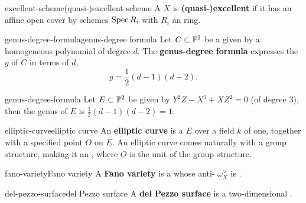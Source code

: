 \begin{topic}{excellent-scheme}{(quasi-)excellent scheme}
    A  $X$ is \textbf{(quasi-)excellent} if it has an affine open cover by schemes $\operatorname{Spec} R_i$ with $R_i$ an  ring.
\end{topic}

\begin{topic}{genus-degree-formula}{genus-degree formula}
    Let $C \subset \mathbb{P}^2$ be a   given by a homogeneous polynomial of degree $d$. The \textbf{genus-degree formula} expresses the  $g$ of $C$ in terms of $d$,
    \[ g = \frac{1}{2}(d - 1)(d - 2) . \]
\end{topic}

\begin{example}{genus-degree-formula}
    Let $E \subset \mathbb{P}^2$ be given by $Y^2Z - X^3 + XZ^2 = 0$ (of degree $3$), then the genus of $E$ is $\frac{1}{2}(d - 1)(d - 2) = 1$.
\end{example}

\begin{topic}{elliptic-curve}{elliptic curve}
    An \textbf{elliptic curve} is a    $E$ over a field $k$ of  one, together with a specified point $O$ on $E$. An elliptic curve comes naturally with a group structure, making it an , where $O$ is the unit of the group structure.
\end{topic}

\begin{topic}{fano-variety}{Fano variety}
    A \textbf{Fano variety} is a  whose anti- $\omega_X^\vee$ is .
\end{topic}

\begin{topic}{del-pezzo-surface}{del Pezzo surface}
    A \textbf{del Pezzo surface} is a two-dimensional .
\end{topic}


